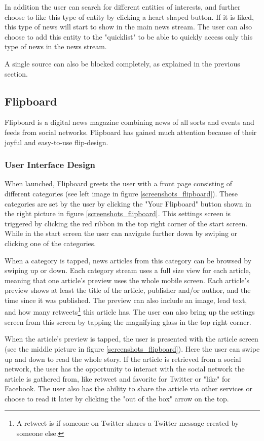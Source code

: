 In addition the user can search for different entities of interests, and further choose to like this type of entity by clicking a heart shaped button. If it is liked, this type of news will start to show in the main news stream. The user can also choose to add this entity to the "quicklist" to be able to quickly access only this type of news in the news stream.

A single source can also be blocked completely, as explained in the previous section.



\subsection{Flipboard}
Flipboard is a digital news magazine combining news of all sorts and events and feeds from social networks. Flipboard has gained much attention because of their joyful and easy-to-use flip-design.

\subsubsection{User Interface Design}
When launched, Flipboard greets the user with a front page consisting of different categories (see left image in figure \ref{screenshots_flipboard}). These categories are set by the user by clicking the "Your Flipboard" button shown in the right picture in figure \ref{screenshots_flipboard}. This settings screen is triggered by clicking the red ribbon in the top right corner of the start screen. While in the start screen the user can navigate further down by swiping or clicking one of the categories.

When a category is tapped, news articles from this category can be browsed by swiping up or down. Each category stream uses a full size view for each article, meaning that one article's preview uses the whole mobile screen. Each article's preview shows at least the title of the article, publisher and/or author, and the time since it was published. The preview can also include an image, lead text, and how many retweets\footnote{A retweet is if someone on Twitter shares a Twitter message created by someone else.} this article has. The user can also bring up the settings screen from this screen by tapping the magnifying glass in the top right corner.

When the article's preview is tapped, the user is presented with the article screen (see the middle picture in figure \ref{screenshots_flipboard}). Here the user can swipe up and down to read the whole story. If the article is retrieved from a social network, the user has the opportunity to interact with the social network the article is gathered from, like retweet and favorite for Twitter or "like" for Facebook. The user also has the ability to share the article via other services or choose to read it later by clicking the "out of the box" arrow on the top.

